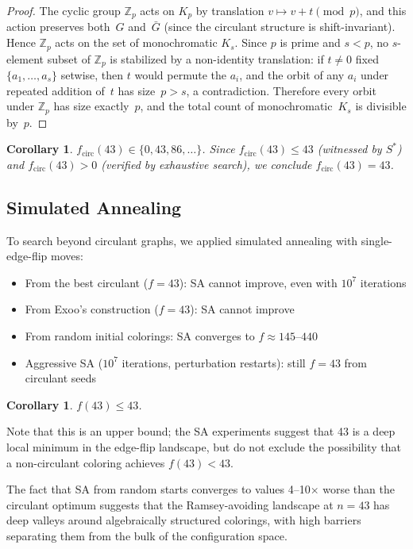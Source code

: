 \documentclass[11pt,a4paper]{article}
\newtheorem{corollary}[theorem]{Corollary}
\theoremstyle{definition}
\theoremstyle{remark}
\newcommand{\ZZ}{\mathbb{Z}}
\newcommand{\Kn}[1]{K_{#1}}
\begin{document}
\begin{proof}
The cyclic group $\ZZ_p$ acts on $\Kn{p}$ by translation
$v \mapsto v + t \pmod{p}$, and this action preserves both~$G$
and~$\bar{G}$ (since the circulant structure is shift-invariant).
Hence $\ZZ_p$ acts on the set of monochromatic $K_s$.
Since $p$ is prime and $s < p$, no $s$-element subset of $\ZZ_p$
is stabilized by a non-identity translation:
if $t \neq 0$ fixed $\{a_1, \ldots, a_s\}$ setwise, then
$t$ would permute the $a_i$, and the orbit of any $a_i$
under repeated addition of~$t$ has size~$p > s$,
a contradiction.
Therefore every orbit under $\ZZ_p$ has size exactly~$p$,
and the total count of monochromatic~$K_s$ is divisible by~$p$.
\end{proof}

\begin{corollary}\label{cor:f43}
$f_{\mathrm{circ}}(43) \in \{0, 43, 86, \ldots\}$.
Since $f_{\mathrm{circ}}(43) \leq 43$ (witnessed by $S^*$)
and $f_{\mathrm{circ}}(43) > 0$ (verified by exhaustive search),
we conclude $f_{\mathrm{circ}}(43) = 43$.
\end{corollary}

\subsection{Simulated Annealing}

To search beyond circulant graphs, we applied simulated annealing
with single-edge-flip moves:
\begin{itemize}
  \item From the best circulant ($f = 43$):
    SA cannot improve, even with $10^7$ iterations
  \item From Exoo's construction ($f = 43$):
    SA cannot improve
  \item From random initial colorings:
    SA converges to $f \approx 145$--$440$
  \item Aggressive SA ($10^7$ iterations, perturbation restarts):
    still $f = 43$ from circulant seeds
\end{itemize}

\begin{corollary}
$f(43) \leq 43$.
\end{corollary}

Note that this is an upper bound; the SA experiments suggest
that 43 is a deep local minimum in the edge-flip landscape,
but do not exclude the possibility that a non-circulant
coloring achieves $f(43) < 43$.

The fact that SA from random starts converges to values
4--10$\times$ worse than the circulant optimum suggests that
the Ramsey-avoiding landscape at $n = 43$ has deep valleys
around algebraically structured colorings, with high barriers
separating them from the bulk of the configuration space.
\end{document}
